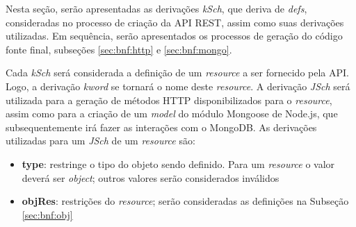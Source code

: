 Nesta seção, serão apresentadas as derivações \textit{kSch}, que deriva de \textit{defs}, consideradas no processo de criação da API REST, assim como suas derivações utilizadas. Em sequência, serão apresentados os processos de geração do código fonte final, subseções \ref{sec:bnf:http} e \ref{sec:bnf:mongo}.


\label{sec:bnf:ksch}

Cada \textit{kSch} será considerada a definição de um \textit{resource} a ser fornecido pela API. Logo, a derivação \textit{kword} se tornará o nome deste \textit{resource}. A derivação \textit{JSch} será utilizada para a geração de métodos HTTP disponibilizados para o \textit{resource}, assim como para a criação de um \textit{model} do módulo Mongoose de Node.js, que subsequentemente irá fazer as interações com o MongoDB. As derivações utilizadas para um \textit{JSch} de um \textit{resource} são:
\begin{itemize}


    \item \textbf{type}: restringe o tipo do objeto sendo definido. Para um \textit{resource} o valor deverá ser \textit{object}; outros valores serão considerados inválidos

    \item \textbf{objRes}: restrições do \textit{resource}; serão consideradas as definições na Subseção \ref{sec:bnf:obj}
\end{itemize}


